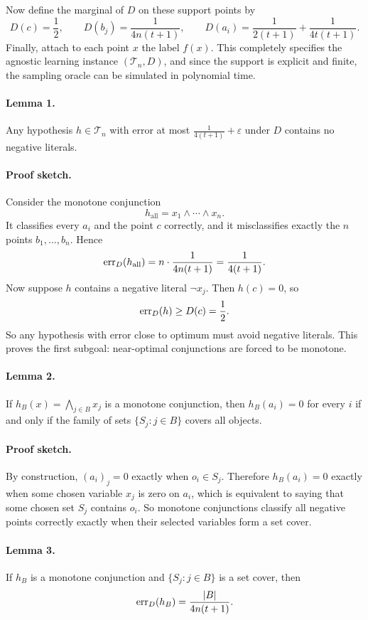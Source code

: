 Now define the marginal of $D$ on these support points by
\[
D(c)=\frac12,\qquad
D(b_j)=\frac{1}{4n(t+1)},\qquad
D(a_i)=\frac{1}{2(t+1)}+\frac{1}{4t(t+1)}.
\]
Finally, attach to each point $x$ the label $f(x)$. This completely specifies the agnostic learning instance $(\mathcal{T}_n,D)$, and since the support is explicit and finite, the sampling oracle can be simulated in polynomial time.

\paragraph{Lemma 1.}
Any hypothesis $h \in \mathcal{T}_n$ with error at most $\frac{1}{4(t+1)}+\varepsilon$ under $D$ contains no negative literals.

\paragraph{Proof sketch.}
Consider the monotone conjunction
\[
h_{\mathrm{all}}=x_1 \wedge \cdots \wedge x_n.
\]
It classifies every $a_i$ and the point $c$ correctly, and it misclassifies exactly the $n$ points $b_1,\dots,b_n$. Hence
\[
\operatorname{err}_D(h_{\mathrm{all}})=n \cdot \frac{1}{4n(t+1)}=\frac{1}{4(t+1)}.
\]
Now suppose $h$ contains a negative literal $\neg x_j$. Then $h(c)=0$, so
\[
\operatorname{err}_D(h)\ge D(c)=\frac12.
\]
So any hypothesis with error close to optimum must avoid negative literals. This proves the first subgoal: near-optimal conjunctions are forced to be monotone.

\paragraph{Lemma 2.}
If $h_B(x)=\bigwedge_{j\in B} x_j$ is a monotone conjunction, then $h_B(a_i)=0$ for every $i$ if and only if the family of sets $\{S_j : j \in B\}$ covers all objects.

\paragraph{Proof sketch.}
By construction, $(a_i)_j=0$ exactly when $o_i \in S_j$. Therefore $h_B(a_i)=0$ exactly when some chosen variable $x_j$ is zero on $a_i$, which is equivalent to saying that some chosen set $S_j$ contains $o_i$. So monotone conjunctions classify all negative points correctly exactly when their selected variables form a set cover.

\paragraph{Lemma 3.}
If $h_B$ is a monotone conjunction and $\{S_j : j \in B\}$ is a set cover, then
\[
\operatorname{err}_D(h_B)=\frac{|B|}{4n(t+1)}.
\]

